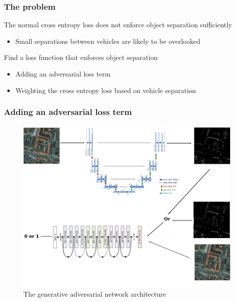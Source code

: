 \documentclass[aspectratio=1610]{beamer}
\begin{document}
\begin{frame}
  \frametitle{\hfill The problem}
	  \begin{block}{The normal cross entropy loss does not enforce object separation sufficiently}
    \begin{itemize}
    \item Small separations between vehicles are likely to be overlooked
    \end{itemize}
  \end{block}
  \begin{block}{Find a loss function that enforces object separation}
    \begin{itemize}
    \item Adding an adversarial loss term
    \item Weighting the cross entropy loss based on vehicle separation
    \end{itemize}
  \end{block}
\end{frame}



\begin{frame}
  \frametitle{\hfill Adding an adversarial loss term}
\begin{figure}[h!]
\centering
      \includegraphics[scale=0.18]{gan}
\caption{The generative adversarial network architecture} \label{fig:SBD}
\end{figure}
\end{frame}
\end{document}

